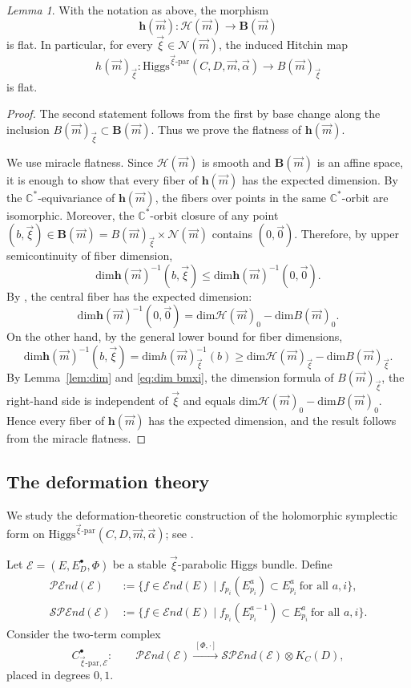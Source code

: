 \documentclass[11pt]{amsart}
\theoremstyle{plain}
\theoremstyle{definition}
\theoremstyle{remark}
\newtheorem{lem}[theorem]{Lemma}
\newcommand{\C}{\mathbb C}
\newcommand{\End}{\mathcal E nd}
\newcommand{\PEnd}{\mathcal P\!\End}
\newcommand{\SPEnd}{\mathcal{SP}\!\End}
\newcommand{\Higgs}{\mathrm{Higgs}}
\def\C{\mathbb{C}}
\def\m{\mu}
\def\m{\mathcal}
\def\dim{\mathrm{dim}}
\def\vxi{\vec{\xi}}
\def\vm{\vec{m}}
\def\bmxi{B(\vm)_{\vxi}}
\def\nm{\mathcal{N}(\vm)}
\begin{document}
\begin{lem}\label{l:flatness xi-par Hitchin}
	With the notation as above, the morphism
	\[
	{\bm h}(\vec m):\bm{\m H}(\vm)\to \bm B(\vm)
	\]
	is flat. In particular, for every $\vxi\in \nm$, the induced Hitchin map
	\[
	h(\vec m)_{\vxi}:
	\Higgs^{\vec\xi\text{-par}}(C,D,\vec m,\vec\alpha)
	\to
	B(\vec m)_{\vec\xi}
	\]
	is flat.
\end{lem}

\begin{proof}
	The second statement follows from the first by base change along the inclusion
	$B(\vec m)_{\vec\xi}\subset \bm B(\vm)$. Thus we prove the flatness of
	$\bm h(\vm)$.

	We use miracle flatness. Since $\bm{\m H}(\vm)$ is smooth and $\bm B(\vm)$ is
	an affine space, it is enough to show that every fiber of $\bm h(\vm)$ has the
	expected dimension. By the $\C^*$-equivariance of $\bm h(\vm)$, the fibers over
	points in the same $\C^*$-orbit are isomorphic. Moreover, the $\C^*$-orbit closure of
	any point $(b,\vxi)\in \bm B(\vm)=\bmxi\times \nm$ contains $(0,\vec 0)$.
	Therefore, by upper semicontinuity of fiber dimension,
	\[
	\dim \bm h(\vm)^{-1}(b,\vxi)
	\leq
	\dim \bm h(\vm)^{-1}(0,\vec 0).
	\]
	By \cite[Theorem~6.8]{Suwangwen2022}, the central fiber has the expected
	dimension:
	\[
	\dim \bm h(\vm)^{-1}(0,\vec 0)
	=
	\dim \m H(\vm)_0-\dim B(\vm)_0.
	\]
	On the other hand, by the general lower bound for fiber dimensions,
	\[
	\dim \bm h(\vm)^{-1}(b,\vxi)=\dim h(\vm)_{\vxi}^{-1}(b)
	\geq
	\dim \m H(\vm)_{\vxi}-\dim B(\vm)_{\vxi}.
	\]
	By Lemma~\ref{lem:dim} and \eqref{eq:dim bmxi}, the dimension formula of $\bmxi$, the right-hand side is
	independent of $\vxi$ and equals $
	\dim \m H(\vm)_0-\dim B(\vm)_0$. Hence every fiber of $\bm h(\vm)$ has the expected dimension, and the result follows from the miracle flatness. 
\end{proof}

\subsection{The deformation theory}\label{sec:xi-par deformation}

We study the deformation-theoretic construction of the holomorphic symplectic form on
$\Higgs^{\vec\xi\text{-par}}(C,D,\vec m,\vec\alpha)$; see \cite{biswasramanan,Bottacin1995symplectic,Yokogawa-infinitesimal, logaresMartens}.

Let $\mathcal E=(E,E_D^\bullet,\Phi)$ be a stable $\vec\xi$-parabolic Higgs bundle. Define
\[
\begin{aligned}
    \PEnd(\mathcal E)&:=\{f\in \End(E)\mid f_{p_i}(E_{p_i}^a)\subset E_{p_i}^a\ \text{for all }a,i\}, \\
    \SPEnd(\mathcal E)&:=\{f\in \End(E)\mid f_{p_i}(E_{p_i}^{a-1})\subset E_{p_i}^{a}\ \text{for all }a,i\}.
\end{aligned}
\]
Consider the two-term complex
\[
C_{\vxi\text{-par},\mathcal E}^\bullet:
\qquad
\PEnd(\mathcal E)
\xrightarrow{\ [\Phi,\cdot]\ }
\SPEnd(\mathcal E)\otimes K_C(D),
\]
placed in degrees $0,1$.
\end{document}
